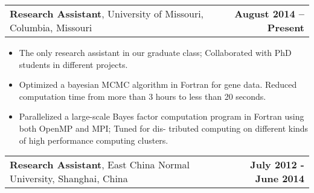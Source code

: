 \documentclass[11pt]{article}
\makeatletter
\newcommand{\headerrow}[2]
{\begin{tabular*}{\linewidth}{l@{\extracolsep{\fill}}r}
	#1 &
	#2 \\
\end{tabular*}}
\makeatother
\begin{document}
\headerrow
{\textbf{Research Assistant}, University of Missouri, Columbia, Missouri}
{\textbf{August 2014 – Present}}
\begin{itemize}
	\item The only research assistant in our graduate class; Collaborated with PhD students in different projects.
	\item Optimized a bayesian MCMC algorithm in Fortran for gene data. Reduced computation time from more than 3 hours to less than 20 seconds.
	\item Parallelized a large-scale Bayes factor computation program in Fortran using both OpenMP and MPI; Tuned for dis- tributed computing on different kinds of high performance computing clusters.
\end{itemize}

\noindent\headerrow
{\textbf{Research Assistant}, East China Normal University, Shanghai, China}
{\textbf{July 2012 - June 2014}}
\end{document}
